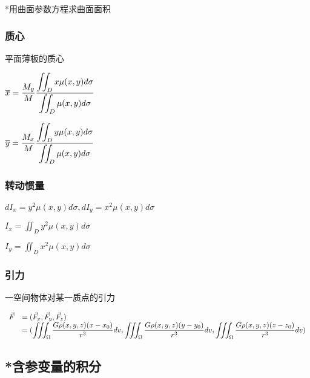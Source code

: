 \documentclass{article} %
\begin{document}
*用曲面参数方程求曲面面积

\subsubsection{质心}
平面薄板的质心\par
$\displaystyle\overline{x}=\frac{M_y}{M}{\displaystyle\iint_D x\mu(x,y)d\sigma\over\displaystyle\iint_D \mu(x,y)d\sigma}$\par
$\displaystyle\overline{y}=\frac{M_x}{M}{\displaystyle\iint_D y\mu(x,y)d\sigma\over\displaystyle\iint_D \mu(x,y)d\sigma}$\par

\subsubsection{转动惯量}
$dI_x=y^2\mu(x,y)d\sigma,dI_y=x^2\mu(x,y)d\sigma$\par
$\displaystyle I_x=\iint_D y^2\mu(x,y)d\sigma$\par
$\displaystyle I_y=\iint_D x^2\mu(x,y)d\sigma$\par

\subsubsection{引力}
一空间物体对某一质点的引力\par
$\begin{array}{rl}
    \vec{F} & =(\vec{F}_x,\vec{F}_y,\vec{F}_z)\\
      & \displaystyle =(\iiint_\Omega{G\rho(x,y,z)(x-x_0) \over r^3}dv,\iiint_\Omega{G\rho(x,y,z)(y-y_0) \over r^3}dv,\iiint_\Omega{G\rho(x,y,z)(z-z_0) \over r^3}dv )
\end{array}$

\subsection{*含参变量的积分}
\end{document}
